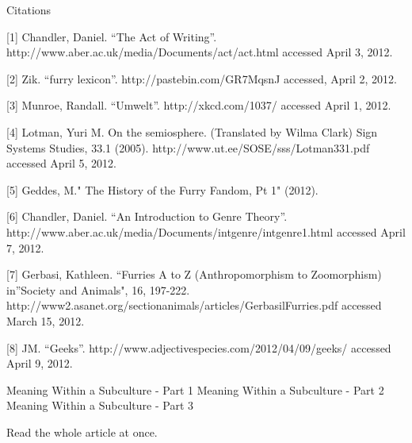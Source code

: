 Citations

{[}1{]} Chandler, Daniel. ``The Act of Writing''. http://www.aber.ac.uk/media/Documents/act/act.html accessed April 3, 2012.

{[}2{]} Zik. ``furry lexicon''. http://pastebin.com/GR7MqsnJ accessed, April 2, 2012.

{[}3{]} Munroe, Randall. ``Umwelt''. http://xkcd.com/1037/ accessed April 1, 2012.

{[}4{]} Lotman, Yuri M. On the semiosphere. (Translated by Wilma Clark) Sign Systems Studies, 33.1 (2005). http://www.ut.ee/SOSE/sss/Lotman331.pdf accessed April 5, 2012.

{[}5{]} Geddes, M." The History of the Furry Fandom, Pt 1" (2012).

{[}6{]} Chandler, Daniel. ``An Introduction to Genre Theory''. http://www.aber.ac.uk/media/Documents/intgenre/intgenre1.html accessed April 7, 2012.

{[}7{]} Gerbasi, Kathleen. ``Furries A to Z (Anthropomorphism to Zoomorphism) in''Society and Animals", 16, 197-222. http://www2.asanet.org/sectionanimals/articles/GerbasilFurries.pdf accessed March 15, 2012.

{[}8{]} JM. ``Geeks''. http://www.adjectivespecies.com/2012/04/09/geeks/ accessed April 9, 2012.

Meaning Within a Subculture - Part 1 Meaning Within a Subculture - Part 2 Meaning Within a Subculture - Part 3

Read the whole article at once.
